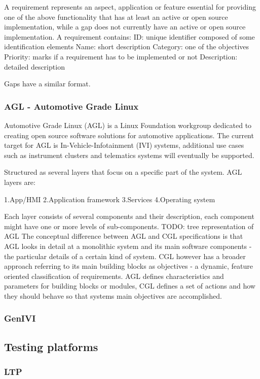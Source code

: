 \documentclass{article}
\begin{document}
			A requirement represents an aspect, application or feature essential for providing one of the above functionality that has at least an active or open source implementation, while a gap does not currently have an active or open source implementation.
			A requirement contains:
			ID: unique identifier composed of some identification elements
			Name: short description
			Category: one of the objectives
			Priority: marks if a requirement has to be implemented or not
			Description: detailed description

			Gaps have a similar format.

		\subsubsection{AGL - Automotive Grade Linux}
			Automotive Grade Linux (AGL) is a Linux Foundation workgroup dedicated to creating open source software solutions for automotive applications. The current target for AGL is In-Vehicle-Infotainment (IVI) systems, additional use cases such as instrument clusters and telematics systems will eventually be supported.

			Structured as several layers that focus on a specific part of the system. AGL layers are:

			1.App/HMI
			2.Application framework
			3.Services
			4.Operating system

		Each layer consists of several components and their description, each component might have one or more levels of sub-components.
		TODO: tree representation of AGL
		The conceptual difference between AGL and CGL specifications is that AGL looks in detail at a monolithic system and its main software components - the particular details of a certain kind of system. CGL however has a broader approach referring to its main building blocks as objectives - a dynamic, feature oriented classification of requirements. AGL defines characteristics and parameters for building blocks or modules, CGL defines a set of actions and how they should behave so that systems main objectives are accomplished.

		\subsubsection{GenIVI}

	\subsection{Testing platforms}
		\subsubsection{LTP}
\end{document}
